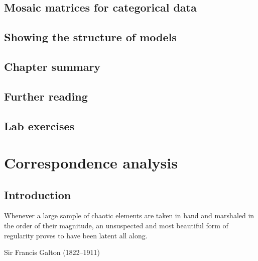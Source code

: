 \documentclass[11pt]{book}\usepackage[]{graphicx}\usepackage[]{color}
\begin{document}
\section{Mosaic matrices for categorical data}\label{sec:mosmat}


\section{Showing the structure of \loglin{} models}\label{sec:mosaic-struc}

\section{Chapter summary}\label{sec:mosaic-summary}


\section{Further reading}\label{sec:mosaic-reading}

\section{Lab exercises}\label{sec:mosaic-lab}







\chapter{Correspondence analysis}\label{ch:corresp}



\section{Introduction}

\epigraph{Whenever a large sample of
chaotic elements
are taken in hand and marshaled in the order of their magnitude, an
unsuspected and most beautiful form of regularity proves to have been
latent all along.}
{Sir Francis Galton (1822--1911)}
\end{document}
